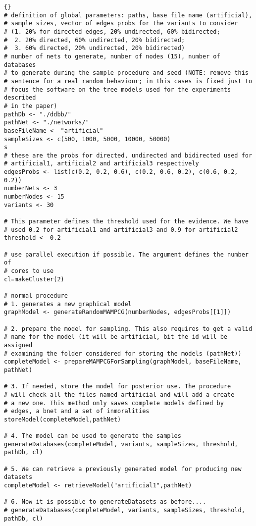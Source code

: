 \documentclass[11pt,professionalfont]{article}
\begin{document}
\begin{small}
\lstset{linewidth=150mm}
\begin{lstlisting}[]{}
# definition of global parameters: paths, base file name (artificial),
# sample sizes, vector of edges probs for the variants to consider
# (1. 20% for directed edges, 20% undirected, 60% bidirected;
#  2. 20% directed, 60% undirected, 20% bidirected;
#  3. 60% directed, 20% undirected, 20% bidirected)
# number of nets to generate, number of nodes (15), number of databases
# to generate during the sample procedure and seed (NOTE: remove this
# sentence for a real random behaviour; in this cases is fixed just to
# focus the software on the tree models used for the experiments described
# in the paper)
pathDb <- "./ddbb/"
pathNet <- "./networks/"
baseFileName <- "artificial"
sampleSizes <- c(500, 1000, 5000, 10000, 50000)
s
# these are the probs for directed, undirected and bidirected used for
# artificial1, artificial2 and artificial3 respectively
edgesProbs <- list(c(0.2, 0.2, 0.6), c(0.2, 0.6, 0.2), c(0.6, 0.2, 0.2))
numberNets <- 3
numberNodes <- 15
variants <- 30

# This parameter defines the threshold used for the evidence. We have
# used 0.2 for artificial1 and artificial3 and 0.9 for artificial2
threshold <- 0.2

# use parallel execution if possible. The argument defines the number of
# cores to use
cl=makeCluster(2)

# normal procedure
# 1. generates a new graphical model
graphModel <- generateRandomMAMPCG(numberNodes, edgesProbs[[1]])

# 2. prepare the model for sampling. This also requires to get a valid
# name for the model (it will be artificial, bit the id will be assigned
# examining the folder considered for storing the models (pathNet))
completeModel <- prepareMAMPCGForSampling(graphModel, baseFileName, pathNet)

# 3. If needed, store the model for posterior use. The procedure
# will check all the files named artificial and will add a create
# a new one. This method only saves complete models defined by
# edges, a bnet and a set of inmoralities
storeModel(completeModel,pathNet)

# 4. The model can be used to generate the samples
generateDatabases(completeModel, variants, sampleSizes, threshold, pathDb, cl)

# 5. We can retrieve a previously generated model for producing new datasets
completeModel <- retrieveModel("artificial1",pathNet)

# 6. Now it is possible to generateDatasets as before....
# generateDatabases(completeModel, variants, sampleSizes, threshold, pathDb, cl)
\end{lstlisting}
\end{small}
\end{document}
